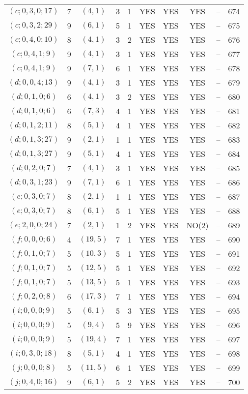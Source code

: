 \begin{longtable}{|c|c|c|c|c|c|c|c|c|c|}
$(c; 0, 3, 0; 17)$ & 7 & $(4, 1)$ & 3 & 1 & YES & YES & YES & -- & 674\\
$(c; 0, 3, 2; 29)$ & 9 & $(6, 1)$ & 5 & 1 & YES & YES & YES & -- & 675\\
$(c; 0, 4, 0; 10)$ & 8 & $(4, 1)$ & 3 & 2 & YES & YES & YES & -- & 676\\
$(c; 0, 4, 1; 9)$ & 9 & $(4, 1)$ & 3 & 1 & YES & YES & YES & -- & 677\\
$(c; 0, 4, 1; 9)$ & 9 & $(7, 1)$ & 6 & 1 & YES & YES & YES & -- & 678\\
$(d; 0, 0, 4; 13)$ & 9 & $(4, 1)$ & 3 & 1 & YES & YES & YES & -- & 679\\
$(d; 0, 1, 0; 6)$ & 6 & $(4, 1)$ & 3 & 2 & YES & YES & YES & -- & 680\\
$(d; 0, 1, 0; 6)$ & 6 & $(7, 3)$ & 4 & 1 & YES & YES & YES & -- & 681\\
$(d; 0, 1, 2; 11)$ & 8 & $(5, 1)$ & 4 & 1 & YES & YES & YES & -- & 682\\
$(d; 0, 1, 3; 27)$ & 9 & $(2, 1)$ & 1 & 1 & YES & YES & YES & -- & 683\\
$(d; 0, 1, 3; 27)$ & 9 & $(5, 1)$ & 4 & 1 & YES & YES & YES & -- & 684\\
$(d; 0, 2, 0; 7)$ & 7 & $(4, 1)$ & 3 & 1 & YES & YES & YES & -- & 685\\
$(d; 0, 3, 1; 23)$ & 9 & $(7, 1)$ & 6 & 1 & YES & YES & YES & -- & 686\\
$(e; 0, 3, 0; 7)$ & 8 & $(2, 1)$ & 1 & 1 & YES & YES & YES & -- & 687\\
$(e; 0, 3, 0; 7)$ & 8 & $(6, 1)$ & 5 & 1 & YES & YES & YES & -- & 688\\
$(e; 2, 0, 0; 24)$ & 7 & $(2, 1)$ & 1 & 2 & YES & YES & NO(2) & -- & 689\\
$(f; 0, 0, 0; 6)$ & 4 & $(19, 5)$ & 7 & 1 & YES & YES & YES & -- & 690\\
$(f; 0, 1, 0; 7)$ & 5 & $(10, 3)$ & 5 & 1 & YES & YES & YES & -- & 691\\
$(f; 0, 1, 0; 7)$ & 5 & $(12, 5)$ & 5 & 1 & YES & YES & YES & -- & 692\\
$(f; 0, 1, 0; 7)$ & 5 & $(13, 5)$ & 5 & 1 & YES & YES & YES & -- & 693\\
$(f; 0, 2, 0; 8)$ & 6 & $(17, 3)$ & 7 & 1 & YES & YES & YES & -- & 694\\
$(i; 0, 0, 0; 9)$ & 5 & $(6, 1)$ & 5 & 3 & YES & YES & YES & -- & 695\\
$(i; 0, 0, 0; 9)$ & 5 & $(9, 4)$ & 5 & 9 & YES & YES & YES & -- & 696\\
$(i; 0, 0, 0; 9)$ & 5 & $(19, 4)$ & 7 & 1 & YES & YES & YES & -- & 697\\
$(i; 0, 3, 0; 18)$ & 8 & $(5, 1)$ & 4 & 1 & YES & YES & YES & -- & 698\\
$(j; 0, 0, 0; 8)$ & 5 & $(11, 5)$ & 6 & 1 & YES & YES & YES & -- & 699\\
$(j; 0, 4, 0; 16)$ & 9 & $(6, 1)$ & 5 & 2 & YES & YES & YES & -- & 700
\end{longtable}
